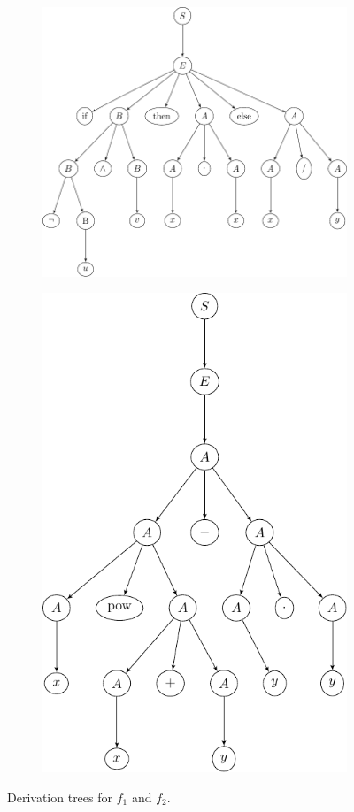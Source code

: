\begin{figure}
	\begin{subfigure}{0.65\textwidth}
	\includegraphics[scale=0.6]{figures/gp_derivation_tree1.pdf}
	\end{subfigure}
	\begin{subfigure}{0.34\textwidth}
	\includegraphics[scale=0.6]{figures/gp_derivation_tree2.pdf}
	\end{subfigure}
	\caption{Derivation trees for $f_1$ and $f_2$.}
	\label{fig:gp-derivation-tree-examples}
\end{figure}
